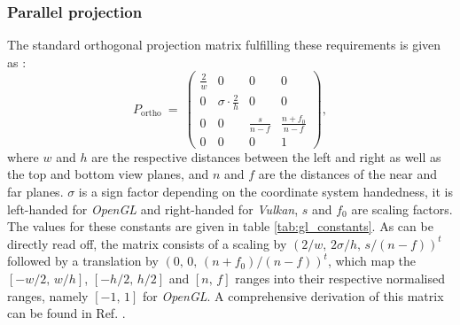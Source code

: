 \subsubsection{Parallel projection}
The standard orthogonal projection matrix fulfilling these requirements is given as
\cite{web_gl_ortho} \cite[p. 82]{Sellers2002}:
\begin{equation}
	P_{\mathrm{ortho}} \ =\
		\left( \begin{array}{cccc}
			\frac{2}{w} &                           0 &              0 &  0                  \\
			          0 &  \sigma \cdot \frac{2}{h} &              0 &  0                  \\
			          0 &                           0 &  \frac{s}{n-f} &  \frac{n+f_0}{n-f}  \\
			          0 &                           0 &              0 &  1
		\end{array} \right),
\end{equation}
where $w$ and $h$ are the respective distances between the left and right as well as the top and bottom 
view planes, and $n$ and $f$ are the distances of the near and far planes.
$\sigma$ is a sign factor depending on the coordinate system handedness, it is left-handed for
\textit{OpenGL} and right-handed for \textit{Vulkan},
$s$ and $f_0$ are scaling factors. The values for these constants are given in table \ref{tab:gl_constants}.
As can be directly read off, the matrix consists of a scaling by
$\left(2/w, \, 2\sigma/h, \, s/(n-f) \right)^t$
followed by a translation by $\left( 0, \, 0, \, (n+f_0)/(n-f) \right)^t$,
which map the $\left[-w/2, \, w/h\right]$, $\left[-h/2, \, h/2\right]$ and $\left[n,\,f\right]$ ranges into their respective
normalised ranges, namely $\left[-1,\, 1\right]$ for \textit{OpenGL}.
A comprehensive derivation of this matrix can be found in Ref. \cite{web_webgl_ortho}.




